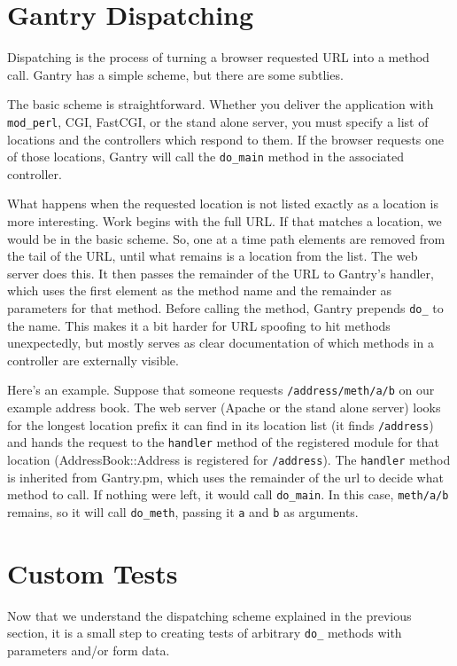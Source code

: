 \section{Gantry Dispatching}

Dispatching is the process of turning a browser requested URL into a method
call.  Gantry has a simple scheme, but there are some subtlies.  

The basic scheme is straightforward.  Whether you deliver the application
with \verb+mod_perl+, CGI, FastCGI, or the stand alone server, you must
specify a list of locations and the controllers which respond to them.  If
the browser requests one of those locations, Gantry will call the
\verb+do_main+ method in the associated controller.

What happens when the requested location is not listed exactly as a location
is more interesting.  Work begins with the full URL.  If that matches
a location, we would be in the basic scheme.  So, one at a time path elements
are removed from the tail of the URL, until what remains is a location from
the list.   The web server does this.  It then passes the remainder of
the URL to Gantry's handler, which uses the first element as the method name
and the remainder as parameters for that method.  Before calling the method,
Gantry prepends \verb+do_+ to the name.  This makes it a bit harder for
URL spoofing to hit methods unexpectedly, but mostly serves as clear
documentation of which methods in a controller are externally visible.

Here's an example.  Suppose that someone requests \verb+/address/meth/a/b+
on our example address book.  The web server (Apache or the stand alone
server) looks for the longest location prefix it can find in its location
list (it finds \verb+/address+) and hands the request to the \verb+handler+
method of the registered module for that location (AddressBook::Address is
registered for \verb+/address+).  The \verb+handler+ method is inherited from
Gantry.pm, which uses the remainder of the url to decide what method to
call.  If nothing were left, it would call \verb+do_main+.  In this case,
\verb+meth/a/b+ remains, so it will call \verb+do_meth+, passing it
\verb+a+ and \verb+b+ as arguments.

\section{Custom Tests}
\label{sec:customtests}

Now that we understand the dispatching scheme explained in the previous
section, it is a small step to creating tests of arbitrary \verb+do_+
methods with parameters and/or form data.

